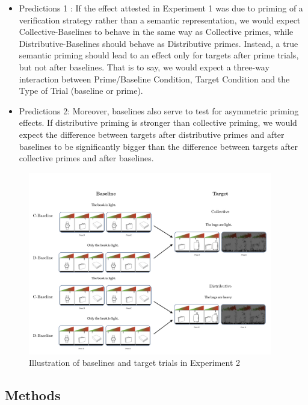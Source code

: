 \documentclass[a4paper, 11pt]{article}
\begin{document}
\begin{itemize}
\item Predictions 1 : If the effect attested in Experiment 1 was due to priming of a verification strategy rather than a semantic representation, we would expect Collective-Baselines to behave in the same way as Collective primes, while Distributive-Baselines should behave as Distributive primes. Instead, a true semantic priming should lead to an effect only for targets after prime trials, but not after baselines. That is to say, we would expect a three-way interaction between Prime/Baseline Condition, Target Condition and the Type of Trial (baseline or prime). 

\item Predictions 2: Moreover, baselines also serve to test for asymmetric priming effects. If distributive priming is stronger than collective priming, we would expect the difference between targets after distributive primes and after baselines to be significantly bigger than the difference between targets after collective primes and after baselines.  


\end{itemize}



\begin{figure}[h!]
  \centering
    \includegraphics[width=0.95\textwidth]{exp2_baselines.jpeg}
      \caption{Illustration of baselines and target trials in Experiment 2}
      \label{fig.examples.item.baselines}
\end{figure}





\subsection{Methods}
\end{document}
